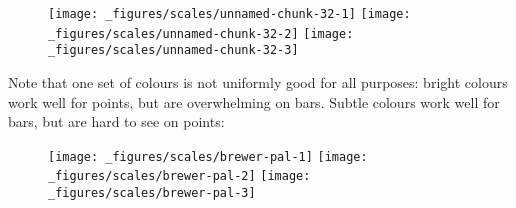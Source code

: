 \begin{itemize}
  \begin{figure}[H]
    \texttt{[image: \_figures/scales/unnamed-chunk-32-1]}%
    \texttt{[image: \_figures/scales/unnamed-chunk-32-2]}%
    \texttt{[image: \_figures/scales/unnamed-chunk-32-3]}
  \end{figure}
\end{itemize}

Note that one set of colours is not uniformly good for all purposes:
bright colours work well for points, but are overwhelming on bars.
Subtle colours work well for bars, but are hard to see on points:

\begin{Shaded}
\begin{Highlighting}[]
\StringTok{ }\NormalTok{(} \OperatorTok{:} \OperatorTok{+}\StringTok{ }\NormalTok{(}\NormalTok{), } \NormalTok{(}\NormalTok{), } \NormalTok{(}\NormalTok{, }\NormalTok{, }\NormalTok{))}
\StringTok{ }\OperatorTok{+}
\StringTok{  }\NormalTok{(}\NormalTok{(}\OperatorTok{+}\StringTok{ }
\StringTok{  }\NormalTok{(} \NormalTok{) }\OperatorTok{+}
\StringTok{  }\NormalTok{(} \NormalTok{, } \NormalTok{)}
\OperatorTok{+}\StringTok{ }\NormalTok{(} \NormalTok{)}
\OperatorTok{+}\StringTok{ }\NormalTok{(} \NormalTok{)  }
\OperatorTok{+}\StringTok{ }\NormalTok{(} \NormalTok{)}
\end{Highlighting}
\end{Shaded}

\begin{figure}[H]
  \texttt{[image: \_figures/scales/brewer-pal-1]}%
  \texttt{[image: \_figures/scales/brewer-pal-2]}%
  \texttt{[image: \_figures/scales/brewer-pal-3]}
\end{figure}

